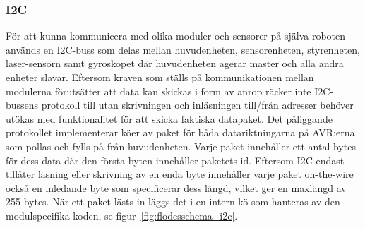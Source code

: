 \documentclass{article}
\begin{document}
\subsubsection{I2C}
\label{sec:i2c}
För att kunna kommunicera med olika moduler och sensorer på själva roboten används en I2C-buss som delas mellan huvudenheten, sensorenheten, styrenheten, laser-sensorn samt gyroskopet där huvudenheten agerar master och alla andra enheter slavar. Eftersom kraven som ställs på kommunikationen mellan modulerna förutsätter att data kan skickas i form av anrop räcker inte I2C-bussens protokoll till utan skrivningen och inläsningen till/från adresser behöver utökas med funktionalitet för att skicka faktiska datapaket. Det påliggande protokollet implementerar köer av paket för båda datariktningarna på AVR:erna som pollas och fylls på från huvudenheten. Varje paket innehåller ett antal bytes för dess data där den första byten innehåller paketets id. Eftersom I2C endast tillåter läsning eller skrivning av en enda byte innehåller varje paket on-the-wire också en inledande byte som specificerar dess längd, vilket ger en maxlängd av 255 bytes. När ett paket lästs in läggs det i en intern kö som hanteras av den modulspecifika koden, se figur~\ref{fig:flodesschema_i2c}.
\end{document}
